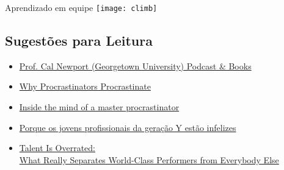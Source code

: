 \begin{frame}{Aprendizado em equipe} %
	\center	\texttt{[image: climb]}
\end{frame}






\subsection{Sugestões para Leitura} %

\begin{frame}{\insertsubsection} 
    \small 
    \begin{itemize}
        \item \href{https://www.calnewport.com/}{Prof. Cal Newport (Georgetown University) Podcast \& Books}
        \item \href{https://waitbutwhy.com/2013/10/why-procrastinators-procrastinate.html}{Why Procrastinators Procrastinate}
        \item \href{https://www.ted.com/talks/tim_urban_inside_the_mind_of_a_master_procrastinator}{Inside the mind of a master procrastinator}
        \item \href{http://qga.com.br/comportamento/jovem/2013/09/porque-os-jovens-profissionais-da-geracao-y-estao-infelizes}{Porque os jovens profissionais da geração Y estão infelizes}
        \item \href{https://www.amazon.com.br/Talent-Overrated-Separates-World-Class-Performers/dp/1591842948}{Talent Is Overrated:\\What Really Separates World-Class Performers from Everybody Else}
    \end{itemize}
\end{frame}

\begin{frame}
	\titlepage
\end{frame} 

